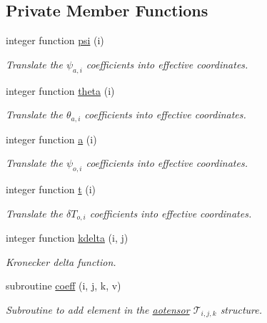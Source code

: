 \subsection*{Private Member Functions}
\begin{DoxyCompactItemize}
\item 
integer function \hyperlink{classaotensor__def_afa05aa849a8cb9e08b36dee6560986b8}{psi} (i)
\begin{DoxyCompactList}\small\item\em Translate the $\psi_{a,i}$ coefficients into effective coordinates. \end{DoxyCompactList}\item 
integer function \hyperlink{classaotensor__def_a506f7d7bc9671005e5ed9a403bb29394}{theta} (i)
\begin{DoxyCompactList}\small\item\em Translate the $\theta_{a,i}$ coefficients into effective coordinates. \end{DoxyCompactList}\item 
integer function \hyperlink{classaotensor__def_abdb4d710d4614fef61179c46d8e26b8e}{a} (i)
\begin{DoxyCompactList}\small\item\em Translate the $\psi_{o,i}$ coefficients into effective coordinates. \end{DoxyCompactList}\item 
integer function \hyperlink{classaotensor__def_aed72341f9a3de19b5e8c21fd27471ce6}{t} (i)
\begin{DoxyCompactList}\small\item\em Translate the $\delta T_{o,i}$ coefficients into effective coordinates. \end{DoxyCompactList}\item 
integer function \hyperlink{classaotensor__def_a13eb91ac3a121fd77c1cf644021cff5b}{kdelta} (i, j)
\begin{DoxyCompactList}\small\item\em Kronecker delta function. \end{DoxyCompactList}\item 
subroutine \hyperlink{classaotensor__def_a0da983fc262aa15a3fde0d6138825660}{coeff} (i, j, k, v)
\begin{DoxyCompactList}\small\item\em Subroutine to add element in the \hyperlink{classaotensor__def_a0dc43bc9294a18f2fe57b67489f1702f}{aotensor} $\mathcal{T}_{i,j,k}$ structure. \end{DoxyCompactList}\item 

\end{DoxyCompactItemize}
